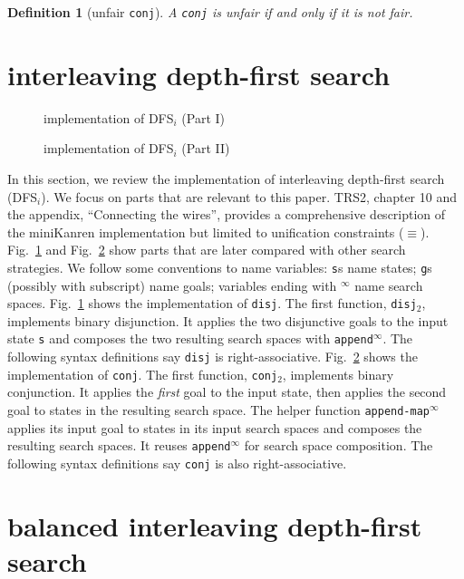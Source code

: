 \documentclass[format=acmlarge, review=true, authordraft=true]{acmart}
\newcommand{\conj}{\texttt{conj}}
\newcommand{\disj}{\texttt{disj}}
\newcommand{\disjtwo}{\texttt{disj$_2$}}
\newcommand{\conjtwo}{\texttt{conj$_2$}}
\newcommand{\DFSi }[0]{DFS$_{i}$}
\newtheorem{defn}{Definition}[section]
\begin{document}
\begin{defn}[unfair \conj{}]
A \conj{} is unfair if and only if it is not fair.
\end{defn}





\section{interleaving depth-first search}

\begin{figure}
	
	\caption{implementation of \DFSi{} (Part I)}
	\label{DFSi-0}
\end{figure}

\begin{figure}
	
	\caption{implementation of \DFSi{} (Part II)}
	\label{DFSi-1}
\end{figure}

In this section, we review the implementation of interleaving depth-first 
search (\DFSi). We focus on parts that are relevant to this paper. TRS2,
chapter 10 and the appendix, ``Connecting the wires'', 
provides a comprehensive description of the 
miniKanren 
implementation but limited to unification constraints ($\equiv$).
Fig.~\ref{DFSi-0} and Fig.~\ref{DFSi-1} show parts that are later compared 
with other search 
strategies. We follow some conventions to name variables: \texttt{s}s name 
states; \texttt{g}s (possibly with subscript) name goals; 
variables ending with $^\infty$ name search spaces. Fig.~\ref{DFSi-0} shows the 
implementation of \disj. The 
first function, \disjtwo, implements binary disjunction. It applies the 
two disjunctive goals to the input state \texttt{s} and composes the two 
resulting search spaces with \texttt{append$^\infty$}. The following syntax 
definitions say \disj{} is right-associative. Fig.~\ref{DFSi-1} 
shows the implementation of \conj. The first function, \conjtwo{}, 
implements binary conjunction. 
It applies the \emph{first} goal to the input state, then applies the second 
goal to states in the resulting search space. The helper function 
\texttt{append-map$^\infty$} applies its input goal to states 
in its input search spaces and composes the resulting search spaces. It reuses 
\texttt{append$^\infty$} for search space composition. The following syntax 
definitions say \conj{} is also right-associative.

\section{balanced interleaving depth-first search}
\end{document}
